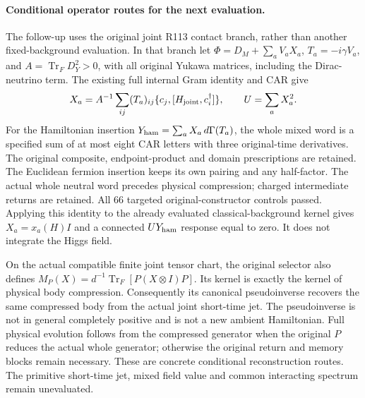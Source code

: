 \paragraph{Conditional operator routes for the next evaluation.}
The follow-up uses the original joint R113 contact branch, rather than
another fixed-background evaluation. In that branch let
\(\Phi=D_M+\sum_a V_aX_a\),
\(T_a=-i\gamma V_a\), and
\(A=\operatorname{Tr}_F D_Y^2>0\), with all original Yukawa matrices,
including the Dirac-neutrino term. The existing full internal Gram
identity and CAR give
\[
 X_a=A^{-1}\sum_{ij}(T_a)_{ij}
       \{c_j,[H_{\rm joint},c_i^\dagger]\},\qquad
 U=\sum_aX_a^2.
\]
For the Hamiltonian insertion
\(Y_{\rm ham}=\sum_aX_a\,d\Gamma(T_a)\), the whole mixed word is a
specified sum of at most eight CAR letters with three original-time
derivatives. The original composite, endpoint-product and domain
prescriptions are retained. The Euclidean fermion insertion keeps its
own pairing and any half-factor. The actual whole neutral word precedes
physical compression; charged intermediate returns are retained.
All 66 targeted original-constructor controls passed. Applying this
identity to the already evaluated classical-background kernel gives
\(X_a=x_a(H)I\) and a connected \(UY_{\rm ham}\) response equal to zero.
It does not integrate the Higgs field.

On the actual compatible finite joint tensor chart, the original selector
also defines \(M_P(X)=d^{-1}\operatorname{Tr}_F[P(X\otimes I)P]\).
Its kernel is exactly the kernel of physical body compression.
Consequently its canonical pseudoinverse recovers the same compressed
body from the actual joint short-time jet. The pseudoinverse is not in
general completely positive and is not a new ambient Hamiltonian.
Full physical evolution follows from the compressed generator when
the original \(P\) reduces the actual whole generator; otherwise the
original return and memory blocks remain necessary. These are concrete
conditional reconstruction routes. The primitive short-time jet,
mixed field value and common interacting spectrum remain unevaluated.

